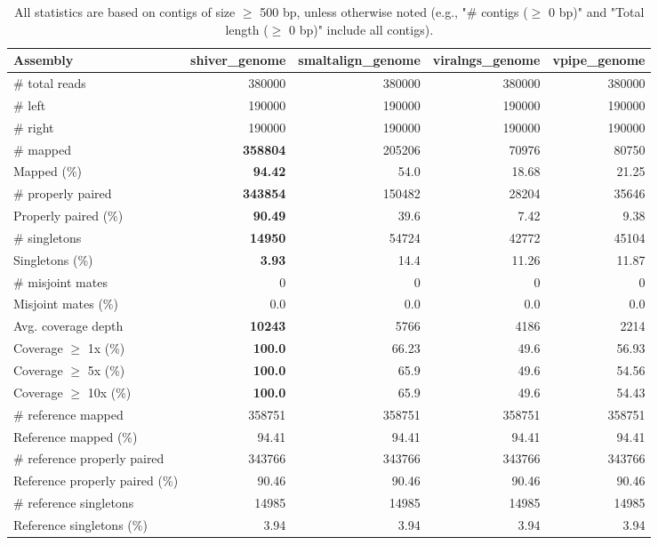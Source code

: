 \documentclass[12pt,a4paper]{article}
\begin{document}
\begin{table}[ht]
\begin{center}
\caption{All statistics are based on contigs of size $\geq$ 500 bp, unless otherwise noted (e.g., "\# contigs ($\geq$ 0 bp)" and "Total length ($\geq$ 0 bp)" include all contigs).}
\begin{tabular}{|l*{4}{|r}|}
\hline
Assembly & shiver\_genome & smaltalign\_genome & viralngs\_genome & vpipe\_genome \\ \hline
\# total reads & 380000 & 380000 & 380000 & 380000 \\ \hline
\# left & 190000 & 190000 & 190000 & 190000 \\ \hline
\# right & 190000 & 190000 & 190000 & 190000 \\ \hline
\# mapped & {\bf 358804} & 205206 & 70976 & 80750 \\ \hline
Mapped (\%) & {\bf 94.42} & 54.0 & 18.68 & 21.25 \\ \hline
\# properly paired & {\bf 343854} & 150482 & 28204 & 35646 \\ \hline
Properly paired (\%) & {\bf 90.49} & 39.6 & 7.42 & 9.38 \\ \hline
\# singletons & {\bf 14950} & 54724 & 42772 & 45104 \\ \hline
Singletons (\%) & {\bf 3.93} & 14.4 & 11.26 & 11.87 \\ \hline
\# misjoint mates & 0 & 0 & 0 & 0 \\ \hline
Misjoint mates (\%) & 0.0 & 0.0 & 0.0 & 0.0 \\ \hline
Avg. coverage depth & {\bf 10243} & 5766 & 4186 & 2214 \\ \hline
Coverage $\geq$ 1x (\%) & {\bf 100.0} & 66.23 & 49.6 & 56.93 \\ \hline
Coverage $\geq$ 5x (\%) & {\bf 100.0} & 65.9 & 49.6 & 54.56 \\ \hline
Coverage $\geq$ 10x (\%) & {\bf 100.0} & 65.9 & 49.6 & 54.43 \\ \hline
\# reference mapped & 358751 & 358751 & 358751 & 358751 \\ \hline
Reference mapped (\%) & 94.41 & 94.41 & 94.41 & 94.41 \\ \hline
\# reference properly paired & 343766 & 343766 & 343766 & 343766 \\ \hline
Reference properly paired (\%) & 90.46 & 90.46 & 90.46 & 90.46 \\ \hline
\# reference singletons & 14985 & 14985 & 14985 & 14985 \\ \hline
Reference singletons (\%) & 3.94 & 3.94 & 3.94 & 3.94 \\ \hline

\end{tabular}
\end{center}
\end{table}
\end{document}
